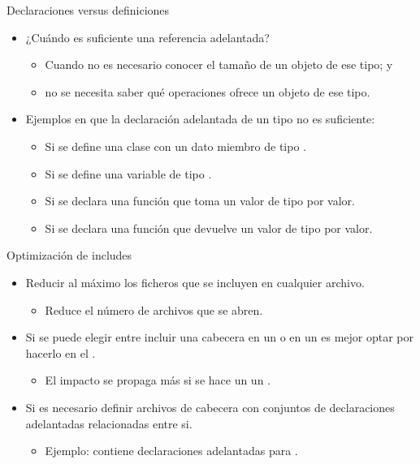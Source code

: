 \begin{frame}[t]{Declaraciones versus definiciones}
\begin{itemize}
  \item ¿Cuándo es suficiente una referencia adelantada?
    \begin{itemize}
      \item Cuando no es necesario conocer el tamaño de un objeto de ese tipo; y
      \item no se necesita saber qué operaciones ofrece un objeto de ese tipo.
    \end{itemize} 

  \vfill
  \item Ejemplos en que la declaración adelantada de un tipo  no es suficiente:
    \begin{itemize}
      \item Si se define una clase con un dato miembro de tipo .
      \item Si se define una variable de tipo .
      \item Si se declara una función que toma un valor de tipo  por valor.
      \item Si se declara una función que devuelve un valor de tipo  por valor.
    \end{itemize}
\end{itemize}
\end{frame}

\begin{frame}[t]{Optimización de includes}
\begin{itemize}
  \item Reducir al máximo los ficheros que se incluyen en cualquier archivo.
    \begin{itemize}
      \item Reduce el número de archivos que se abren.
    \end{itemize}
  \vfill
  \item Si se puede elegir entre incluir una cabecera en un  o en un 
        es mejor optar por hacerlo en el .
    \begin{itemize}
      \item El impacto se propaga más si se hace un un .
    \end{itemize}
  \vfill
  \item Si es necesario definir archivos de cabecera con conjuntos de declaraciones adelantadas
        relacionadas entre si.
    \begin{itemize}
      \item Ejemplo:  contiene declaraciones adelantadas para .
    \end{itemize}
\end{itemize}
\end{frame}

